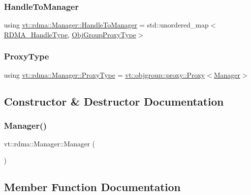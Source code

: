 \subsubsection{\texorpdfstring{Handle\+To\+Manager}{HandleToManager}}
{\footnotesize\ttfamily using \hyperlink{structvt_1_1rdma_1_1_manager_aac6e7c58d320c302ea08461941d65f6e}{vt\+::rdma\+::\+Manager\+::\+Handle\+To\+Manager} =  std\+::unordered\+\_\+map$<$\hyperlink{namespacevt_a10442579ec4e7ebef223818e64bcf908}{R\+D\+M\+A\+\_\+\+Handle\+Type}, \hyperlink{namespacevt_ad7cae989df485fccca57f0792a880a8e}{Obj\+Group\+Proxy\+Type}$>$}

\mbox{\label{structvt_1_1rdma_1_1_manager_a75d5cdc6428ea19f5ec665b04dcd7166}} 
\subsubsection{\texorpdfstring{Proxy\+Type}{ProxyType}}
{\footnotesize\ttfamily using \hyperlink{structvt_1_1rdma_1_1_manager_a75d5cdc6428ea19f5ec665b04dcd7166}{vt\+::rdma\+::\+Manager\+::\+Proxy\+Type} =  \hyperlink{structvt_1_1objgroup_1_1proxy_1_1_proxy}{vt\+::objgroup\+::proxy\+::\+Proxy}$<$\hyperlink{structvt_1_1rdma_1_1_manager}{Manager}$>$}



\subsection{Constructor \& Destructor Documentation}
\mbox{\label{structvt_1_1rdma_1_1_manager_aa5d34a3c5fa988278255562eea5f8aca}} 
\subsubsection{\texorpdfstring{Manager()}{Manager()}}
{\footnotesize\ttfamily vt\+::rdma\+::\+Manager\+::\+Manager (\begin{DoxyParamCaption}{ }\end{DoxyParamCaption})}



\subsection{Member Function Documentation}
\mbox{\label{structvt_1_1rdma_1_1_manager_ab79a91b3feabfc37e6f0b5000e9d3949}} 
